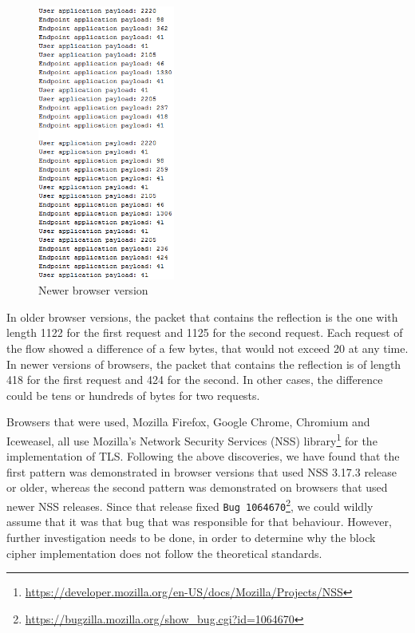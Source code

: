 \begin{figure}[H] \caption{Newer browser version} \centering
\includegraphics[width=0.4\textwidth]{diagrams/newer_browser_version.png}\end{figure}

In older browser versions, the packet that contains the reflection is the one
with length 1122 for the first request and 1125 for the second request.  Each
request of the flow showed a difference of a few bytes, that would not exceed 20
at any time. In newer versions of browsers, the packet that contains the
reflection is of length 418 for the first request and 424 for the second. In
other cases, the difference could be tens or hundreds of bytes for two requests.

Browsers that were used, Mozilla Firefox, Google Chrome, Chromium and Iceweasel,
all use Mozilla's Network Security Services (NSS)
library\footnote{\url{https://developer.mozilla.org/en-US/docs/Mozilla/Projects/NSS}}
for the implementation of TLS. Following the above discoveries, we have found
that the first pattern was demonstrated in browser versions that used NSS
3.17.3 release or older, whereas the second pattern was demonstrated on
browsers that used newer NSS releases. Since that release fixed \texttt{Bug
1064670}\footnote{\url{https://bugzilla.mozilla.org/show_bug.cgi?id=1064670}},
we could wildly assume that it was that bug that was responsible for that
behaviour.  However, further investigation needs to be done, in order to
determine why the block cipher implementation does not follow the
theoretical standards.

